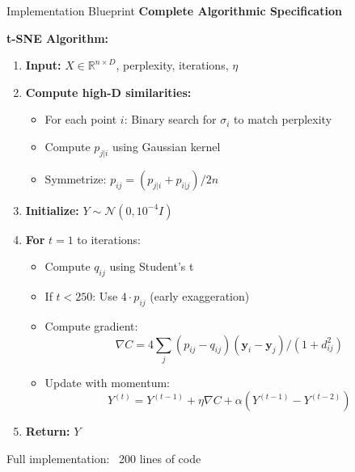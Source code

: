 \documentclass[10pt]{beamer}
\newcommand{\emphtext}[1]{\textcolor{upcblue}{\textbf{#1}}}
\newcommand{\conceptbox}[1]{\colorbox{upcblue!10}{\begin{minipage}{0.85\textwidth}\centering #1\end{minipage}}}
\begin{document}
\begin{frame}{Implementation Blueprint}
\emphtext{Complete Algorithmic Specification}

\vspace{0.3cm}
\textbf{t-SNE Algorithm:}

\begin{enumerate}
\small
\item \textbf{Input:} $X \in \mathbb{R}^{n \times D}$, perplexity, iterations, $\eta$

\item \textbf{Compute high-D similarities:}
\begin{itemize}
\footnotesize
\item For each point $i$: Binary search for $\sigma_i$ to match perplexity
\item Compute $p_{j|i}$ using Gaussian kernel
\item Symmetrize: $p_{ij} = (p_{j|i} + p_{i|j})/2n$
\end{itemize}

\item \textbf{Initialize:} $Y \sim \mathcal{N}(0, 10^{-4}I)$

\item \textbf{For} $t = 1$ to iterations:
\begin{itemize}
\footnotesize
\item Compute $q_{ij}$ using Student's t
\item If $t < 250$: Use $4 \cdot p_{ij}$ (early exaggeration)
\item Compute gradient:
$$\nabla C = 4\sum_j (p_{ij}-q_{ij})(\mathbf{y}_i-\mathbf{y}_j)/(1+d_{ij}^2)$$
\item Update with momentum:
$$Y^{(t)} = Y^{(t-1)} + \eta \nabla C + \alpha(Y^{(t-1)}-Y^{(t-2)})$$
\end{itemize}

\item \textbf{Return:} $Y$
\end{enumerate}

\vspace{0.2cm}
\begin{center}
\conceptbox{\footnotesize Full implementation: ~200 lines of code}
\end{center}
\end{frame}
\end{document}

